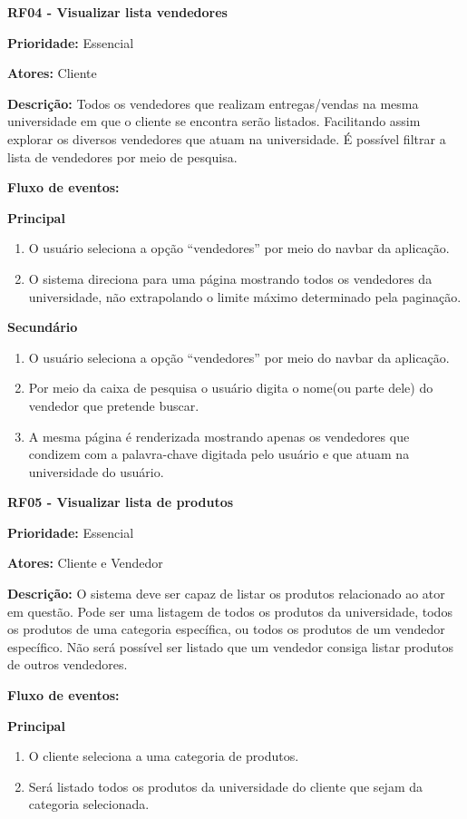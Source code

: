 \begin{apendicesenv}
\textbf{RF04 - Visualizar lista vendedores} \par
\textbf{Prioridade:} Essencial \par
\textbf{Atores:} Cliente \par
\textbf{Descrição:} Todos os vendedores que realizam entregas/vendas na mesma universidade em que o cliente se encontra serão listados. Facilitando assim explorar os diversos vendedores que atuam na universidade. É possível filtrar a lista de vendedores por meio de pesquisa. \par
\textbf{Fluxo de eventos:} \par
\textbf{Principal} \par
\begin{enumerate}
  \item O usuário seleciona a opção “vendedores” por meio do navbar da aplicação.
  \item O sistema direciona para uma página mostrando todos os vendedores da universidade, não extrapolando o limite máximo determinado pela paginação.
\end{enumerate} \par
\textbf{Secundário} \par
\begin{enumerate}
  \item O usuário seleciona a opção “vendedores” por meio do navbar da aplicação.
  \item Por meio da caixa de pesquisa o usuário digita o nome(ou parte dele) do vendedor que pretende buscar.
  \item A mesma página é renderizada mostrando apenas os vendedores que condizem com a palavra-chave digitada pelo usuário e que atuam na universidade do usuário.
\end{enumerate}

\textbf{RF05 - Visualizar lista de produtos} \par
\textbf{Prioridade:} Essencial \par
\textbf{Atores:} Cliente e Vendedor \par
\textbf{Descrição:} O sistema deve ser capaz de listar os produtos relacionado ao ator em questão. Pode ser uma listagem de todos os produtos da universidade, todos os produtos de uma categoria específica, ou todos os produtos de um vendedor específico. Não será possível ser listado que um vendedor consiga listar produtos de outros vendedores. \par
\textbf{Fluxo de eventos:} \par
\textbf{Principal} \par
\begin{enumerate}
  \item O cliente seleciona a uma categoria de produtos.
  \item Será listado todos os produtos da universidade do cliente que sejam da categoria selecionada.
\end{enumerate}


\end{apendicesenv}
